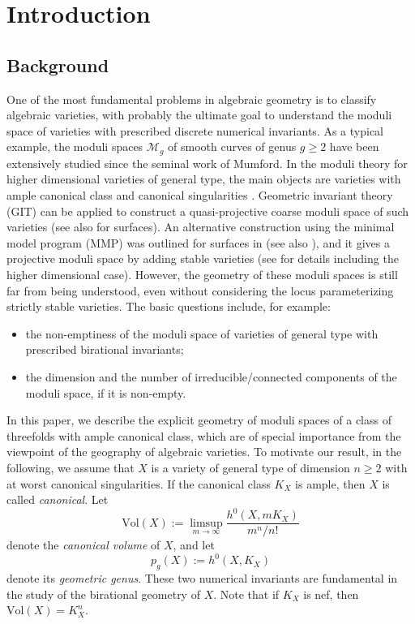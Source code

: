 \documentclass[a4paper,11pt]{amsart}
\newcommand{\M}{\ensuremath{\mathcal{M}}}
\theoremstyle{definition}
\theoremstyle{remark}
\numberwithin{equation}{section}
\begin{document}
\maketitle

\setcounter{tocdepth}{1}
\tableofcontents


\section{Introduction} 

\subsection{Background} 

One of the most fundamental problems in algebraic geometry is to classify algebraic varieties, with probably the ultimate goal to understand the moduli space of varieties with prescribed discrete numerical invariants. As a typical example, the moduli spaces $\M_g$ of smooth curves of genus $g \ge 2$ have been extensively studied since the seminal work of Mumford. In the moduli theory for higher dimensional varieties of general type, the main objects are varieties with ample canonical class and canonical singularities \cite[\S 1.2]{Kollar}. Geometric invariant theory (GIT) can be applied to construct a quasi-projective coarse moduli space of such varieties \cite{Viehweg} (see also \cite{Gieseker} for surfaces). An alternative construction using the minimal model program (MMP) was outlined for surfaces in \cite{KSB} (see also \cite{Alexeev}), and it gives a projective moduli space by adding stable varieties (see \cite{Kollar} for details including the higher dimensional case). 
However, the geometry of these moduli spaces is still far from being understood, even without considering the locus parameterizing strictly stable varieties. The basic questions include, for example:
\begin{itemize}
	\item the non-emptiness of the moduli space of varieties of general type with prescribed birational invariants;
	
	\item the dimension and the number of irreducible/connected components of the moduli space, if it is non-empty.
\end{itemize}

In this paper, we describe the explicit geometry of moduli spaces of a class of threefolds with ample canonical class, which are of special importance from the viewpoint of the geography of algebraic varieties. To motivate our result, in the following, we assume that $X$ is a variety of general type of dimension $n \ge 2$ with at worst canonical singularities. If the canonical class $K_X$ is ample, then $X$ is called {\em canonical}. Let 
$$
\mathrm{Vol}(X) := \limsup\limits_{m \to \infty} \frac{h^0(X, mK_X)}{m^n/n!}
$$
denote the \emph{canonical volume} of $X$, and let 
$$
p_g(X) := h^0(X, K_X)
$$ 
denote its \emph{geometric genus}. These two numerical invariants are fundamental in the study of the birational geometry of $X$. Note that if $K_X$ is nef, then $\mathrm{Vol}(X) = K_X^n$. 
\end{document}
